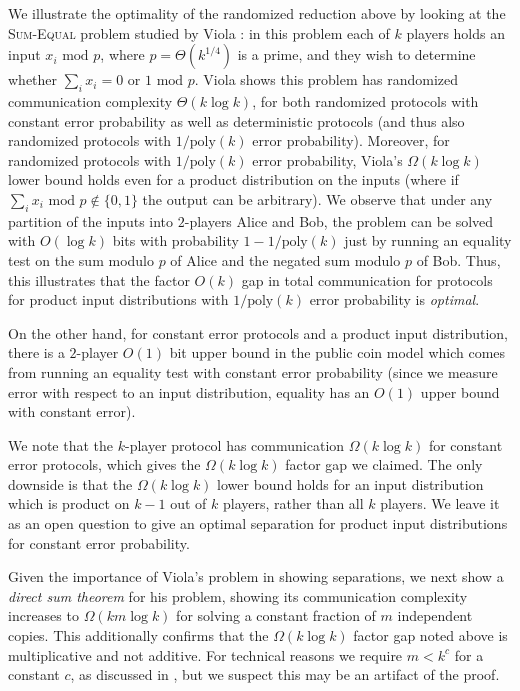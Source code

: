\documentclass{toc}
\renewcommand{\mod}{\text{ mod }}
\newcommand{\bigo}[1]{\ensuremath{{{O} \left( {#1} \right)}}}
\newcommand{\bigomega}[1]{\ensuremath{{\Omega \left( {#1} \right)}}}
\newcommand{\bigtheta}[1]{\ensuremath{{\Theta\left({#1} \right)}}}
\newcommand{\sumequal}{\textsc{Sum-Equal} }
\begin{document}
We illustrate the optimality of the randomized reduction above by
looking at the \sumequal problem studied by Viola \cite{Viola:2013we}:
in this problem each of $k$ players holds an input $x_i \mod p$, where
$p = \bigtheta{k^{1/4}}$ is a prime, and they wish to determine whether
$\sum_i x_i = 0$ or $1 \mod p$. Viola shows
this problem has randomized communication complexity $\bigtheta{k \log k}$, 
for both randomized protocols with constant error probability as well
as deterministic protocols (and thus also randomized protocols with
$1/\textrm{poly}(k)$ error probability). Moreover, for randomized protocols
with $1/\textrm{poly}(k)$ error probability, Viola's $\Omega(k \log k)$
lower bound holds even for a product distribution on the inputs (where
if $\sum_i x_i \mod p \notin \{0,1\}$ the output can be arbitrary).  
We observe that under any partition of the inputs into $2$-players
Alice and Bob,
the problem can be solved with $\bigo{\log k}$ bits with probability
$1-1/\textrm{poly}(k)$ just by running an equality test on the sum
modulo $p$ of Alice and the negated sum modulo $p$ of Bob. Thus, this
illustrates that the factor $O(k)$ gap in total communication for protocols for product input 
distributions with $1/\textrm{poly}(k)$ error probability is \emph{optimal}. 

On the other hand, for constant error protocols and a product input 
distribution, there is a 
$2$-player $\bigo{1}$ bit upper bound in the public coin model which comes
from running an equality test with constant error probability
(since we measure error with respect to an input distribution, equality
has an $O(1)$ upper bound with constant error). 

We note that the $k$-player protocol has communication $\bigomega{k \log k}$
for constant error protocols, 
which gives the $\bigomega{k \log k}$ factor gap we claimed. The only
downside is that the $\bigomega{k \log k}$ lower bound  holds for an input 
distribution which is product
on $k-1$ out of $k$ players, rather than all $k$ players. We leave it as an open question
to give an optimal separation for product input distributions for 
constant error probability. 


Given the importance of Viola's problem in showing separations, 
we next show a \emph{direct sum theorem} for his problem,
showing its communication complexity increases to $\bigomega{km \log k }$
for solving a constant fraction of $m$ independent copies. This additionally confirms that the $\Omega(k \log k)$ factor gap noted above is multiplicative and not additive. {\color{black}For technical reasons we require $m < k^c$ for a constant $c$, as discussed in , but we suspect this may be an artifact of the proof.}
\end{document}
